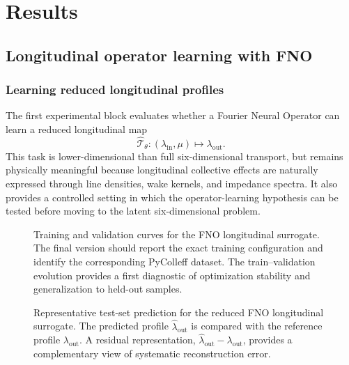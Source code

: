 
\section{Results}
\label{sec:results}

\subsection{Longitudinal operator learning with FNO}
\label{subsec:results_fno}

\subsubsection{Learning reduced longitudinal profiles}
\label{subsubsec:fno_longitudinal_profiles}

The first experimental block evaluates whether a Fourier Neural Operator can learn a reduced longitudinal map
\begin{equation}
\widehat{\mathcal{T}}_{\theta}
:
(\lambda_{\mathrm{in}},\mu)
\mapsto
\lambda_{\mathrm{out}}.
\label{eq:fno_longitudinal_map_results}
\end{equation}
This task is lower-dimensional than full six-dimensional transport, but remains physically meaningful because longitudinal collective effects are naturally expressed through line densities, wake kernels, and impedance spectra. It also provides a controlled setting in which the operator-learning hypothesis can be tested before moving to the latent six-dimensional problem.

\begin{figure}[H]
\centering
{}
\caption{
Training and validation curves for the FNO longitudinal surrogate. The final version should report the exact training configuration and identify the corresponding PyColleff dataset. The train--validation evolution provides a first diagnostic of optimization stability and generalization to held-out samples.
}
\label{fig:fno_training_curves_revised}
\end{figure}

\begin{figure}[H]
\centering
{}
\caption{
Representative test-set prediction for the reduced FNO longitudinal surrogate. The predicted profile \(\widehat{\lambda}_{\mathrm{out}}\) is compared with the reference profile \(\lambda_{\mathrm{out}}\). A residual representation,
\(\widehat{\lambda}_{\mathrm{out}}-\lambda_{\mathrm{out}}\),
provides a complementary view of systematic reconstruction error.
}
\label{fig:fno_profile_predictions_revised}
\end{figure}

